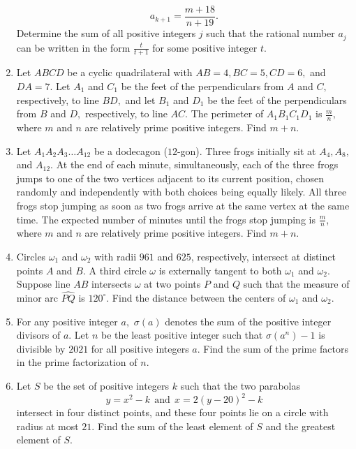 \documentclass{article}
\begin{document}
\begin{enumerate}[label=\arabic*., itemsep=0.5em]
\begin{equation*}
a_{k+1} = \frac{m + 18}{n+19}.
\end{equation*}
Determine the sum of all positive integers $j$ such that the rational number $a_j$ can be written in the form $\frac{t}{t+1}$ for some positive integer $t$.\par \vspace{0.5em}\item Let $ABCD$ be a cyclic quadrilateral with $AB=4,BC=5,CD=6,$ and $DA=7.$ Let $A_1$ and $C_1$ be the feet of the perpendiculars from $A$ and $C,$ respectively, to line $BD,$ and let $B_1$ and $D_1$ be the feet of the perpendiculars from $B$ and $D,$ respectively, to line $AC.$ The perimeter of $A_1B_1C_1D_1$ is $\frac mn,$ where $m$ and $n$ are relatively prime positive integers. Find $m+n.$\par \vspace{0.5em}\item Let $A_1A_2A_3\ldots A_{12}$ be a dodecagon ($12$-gon). Three frogs initially sit at $A_4,A_8,$ and $A_{12}$. At the end of each minute, simultaneously, each of the three frogs jumps to one of the two vertices adjacent to its current position, chosen randomly and independently with both choices being equally likely. All three frogs stop jumping as soon as two frogs arrive at the same vertex at the same time. The expected number of minutes until the frogs stop jumping is $\frac mn$, where $m$ and $n$ are relatively prime positive integers. Find $m+n$.\par \vspace{0.5em}\item Circles $\omega_1$ and $\omega_2$ with radii $961$ and $625$, respectively, intersect at distinct points $A$ and $B$. A third circle $\omega$ is externally tangent to both $\omega_1$ and $\omega_2$. Suppose line $AB$ intersects $\omega$ at two points $P$ and $Q$ such that the measure of minor arc $\widehat{PQ}$ is $120^{\circ}$. Find the distance between the centers of $\omega_1$ and $\omega_2$.\par \vspace{0.5em}\item For any positive integer $a,$ $\sigma(a)$ denotes the sum of the positive integer divisors of $a$. Let $n$ be the least positive integer such that $\sigma(a^n)-1$ is divisible by $2021$ for all positive integers $a$. Find the sum of the prime factors in the prime factorization of $n$.\par \vspace{0.5em}\item Let $S$ be the set of positive integers $k$ such that the two parabolas
\begin{equation*}
y=x^2-k~~\text{and}~~x=2(y-20)^2-k
\end{equation*}
intersect in four distinct points, and these four points lie on a circle with radius at most $21$. Find the sum of the least element of $S$ and the greatest element of $S$.\par \vspace{0.5em}\end{enumerate}
\end{document}
